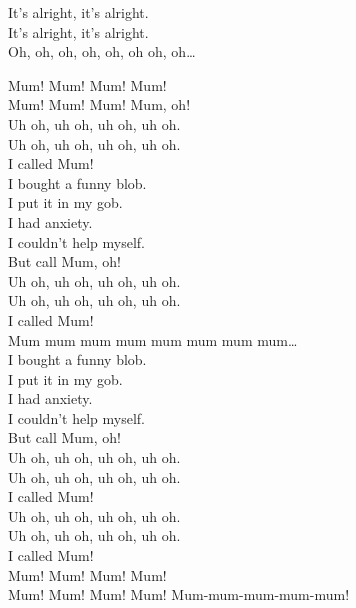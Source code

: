 It's alright, it's alright. \\
It's alright, it's alright. \\

Oh, oh, oh, oh, oh, oh oh, oh… \\




Mum! Mum! Mum! Mum! \\
Mum! Mum! Mum! Mum, oh! \\

Uh oh, uh oh, uh oh, uh oh. \\
Uh oh, uh oh, uh oh, uh oh. \\
I called Mum! \\

I bought a funny blob. \\
I put it in my gob. \\
I had anxiety. \\
I couldn't help myself. \\
But call Mum, oh! \\

Uh oh, uh oh, uh oh, uh oh. \\
Uh oh, uh oh, uh oh, uh oh. \\
I called Mum! \\

Mum mum mum mum mum mum mum mum… \\

I bought a funny blob. \\
I put it in my gob. \\
I had anxiety. \\
I couldn't help myself. \\
But call Mum, oh! \\

Uh oh, uh oh, uh oh, uh oh. \\
Uh oh, uh oh, uh oh, uh oh. \\
I called Mum! \\

Uh oh, uh oh, uh oh, uh oh. \\
Uh oh, uh oh, uh oh, uh oh. \\
I called Mum! \\

Mum! Mum! Mum! Mum! \\
Mum! Mum! Mum! Mum! Mum-mum-mum-mum-mum! \\

